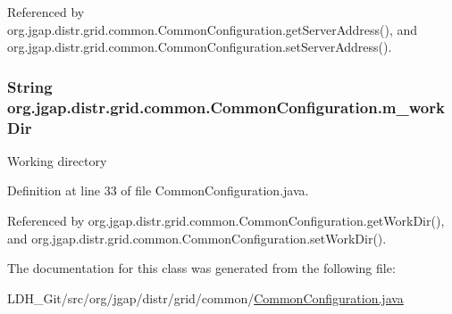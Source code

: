 Referenced by org.\-jgap.\-distr.\-grid.\-common.\-Common\-Configuration.\-get\-Server\-Address(), and org.\-jgap.\-distr.\-grid.\-common.\-Common\-Configuration.\-set\-Server\-Address().

\hypertarget{classorg_1_1jgap_1_1distr_1_1grid_1_1common_1_1_common_configuration_aae3a21d46d0bcb5c908d5d8ac1a2a768}{
\subsubsection[{m\-\_\-work\-Dir}]{\setlength{\rightskip}{0pt plus 5cm}String org.\-jgap.\-distr.\-grid.\-common.\-Common\-Configuration.\-m\-\_\-work\-Dir\hspace{0.3cm}{\ttfamily [private]}}}\label{classorg_1_1jgap_1_1distr_1_1grid_1_1common_1_1_common_configuration_aae3a21d46d0bcb5c908d5d8ac1a2a768}
Working directory 

Definition at line 33 of file Common\-Configuration.\-java.



Referenced by org.\-jgap.\-distr.\-grid.\-common.\-Common\-Configuration.\-get\-Work\-Dir(), and org.\-jgap.\-distr.\-grid.\-common.\-Common\-Configuration.\-set\-Work\-Dir().



The documentation for this class was generated from the following file\-:\begin{DoxyCompactItemize}
\item 
L\-D\-H\-\_\-\-Git/src/org/jgap/distr/grid/common/\hyperlink{_common_configuration_8java}{Common\-Configuration.\-java}\end{DoxyCompactItemize}
